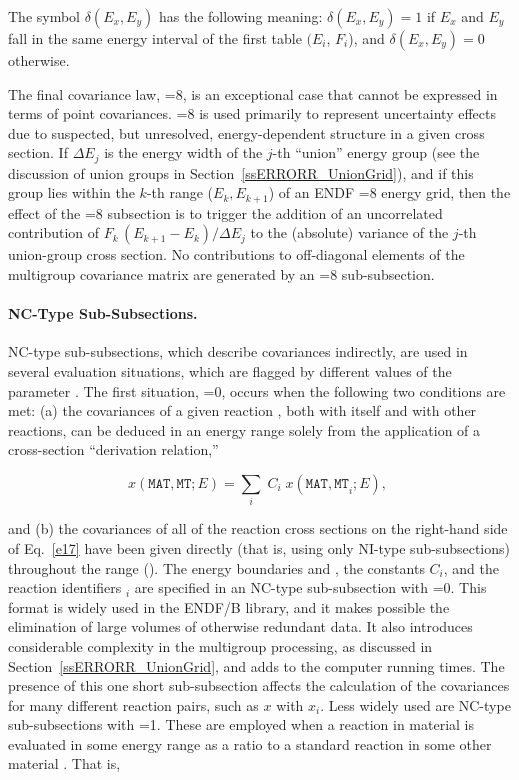 \noindent
The symbol $\delta (E_x,E_y)$ has the following meaning: $\delta
(E_x,E_y){ =} 1$ if $E_x$ and $E_y$ fall in the same energy interval of
the first table $(E_i$, $F_i$), and $\delta(E_x,E_y){ =} 0$ otherwise.

The final covariance law, =8, is an exceptional case that
cannot be expressed in terms of point covariances.  =8 is
used primarily to represent uncertainty effects due to suspected, but
unresolved, energy-dependent structure in a given cross section.  If
$\Delta E_j$ is the energy width of the $j$-th ``union'' energy group
(see the discussion of union groups in Section~\ref{ssERRORR_UnionGrid}),
and if this group
lies within the $k$-th range ($E_k, E_{k+1}$) of an ENDF =8
energy grid, then the effect of the =8 subsection is to
trigger the addition of an uncorrelated contribution of
$F_k\,(E_{k+1} - E_k )/\Delta E_j$ to the (absolute) variance
of the $j$-th union-group cross section.  No contributions to
off-diagonal elements of the multigroup covariance matrix are
generated by an =8 sub-subsection.

\paragraph{NC-Type Sub-Subsections.} NC-type sub-subsections, which
describe covariances indirectly, are used in several evaluation
situations, which are flagged by different values of the parameter
.  The first situation, =0, occurs when the
following two conditions are met:  (a) the covariances of a given
reaction , both with itself and with other reactions, can be
deduced in an energy range  solely from the application
of a cross-section ``derivation relation,''

\begin{equation}
x({\mathtt{MAT,MT}};E) = \sum_{i} \; C_i \; x({\mathtt{MAT,MT}}_i; E),\;
\label{e17}
\end{equation}

\noindent
and (b) the covariances of all of the reaction cross sections on the
right-hand side of Eq.~\ref{e17} have been given directly (that is, using
only NI-type sub-subsections) throughout the range ().
The energy boundaries  and , the constants $C_i$,
and the reaction identifiers $_i$ are specified in an NC-type
sub-subsection with =0.  This format is widely used in the
ENDF/B library, and it makes possible the elimination of large volumes
of otherwise redundant data.  It also introduces considerable
complexity in the multigroup processing, as discussed in
Section~\ref{ssERRORR_UnionGrid}, and
adds to the computer running times. The presence of this one short
sub-subsection affects the calculation of the covariances for many
different reaction pairs, such as $x$ with
$x$$_i$\cword{)}.  Less widely used are NC-type
sub-subsections with =1.  These are employed when a reaction
 in material  is evaluated in some energy range
 as a ratio to a standard reaction  in some
other material .  That is,

